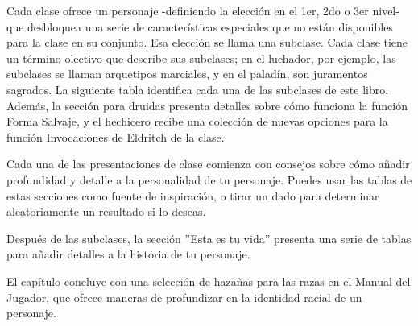\documentclass[a4paper,twocolumn,openany,10pt]{dndbook}
\begin{document}
Cada clase ofrece un personaje -definiendo la elección en el 1er, 2do o 3er nivel- que desbloquea una serie de características
especiales que no están disponibles para la clase en su conjunto. Esa elección se llama una subclase. Cada clase tiene un término 
olectivo que describe sus subclases; en el luchador, por ejemplo, las subclases se llaman arquetipos marciales, y en el paladín,
son juramentos sagrados. La siguiente tabla identifica cada una de las subclases de este libro. Además, la sección para druidas
presenta detalles sobre cómo funciona la función Forma Salvaje, y el hechicero recibe una colección de nuevas opciones para la
función Invocaciones de Eldritch de la clase.

Cada una de las presentaciones de clase comienza con consejos sobre cómo añadir profundidad y detalle a la personalidad de tu
personaje. Puedes usar las tablas de estas secciones como fuente de inspiración, o tirar un dado para determinar aleatoriamente
un resultado si lo deseas.

Después de las subclases, la sección ''Esta es tu vida'' presenta una serie de tablas para añadir detalles a la historia de tu
personaje.

El capítulo concluye con una selección de hazañas para las razas en el Manual del Jugador, que ofrece maneras de profundizar en
la identidad racial de un personaje.
\end{document}
